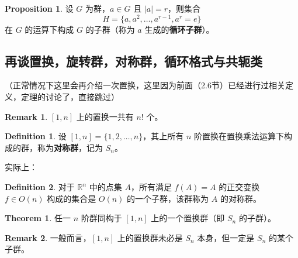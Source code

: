 \documentclass[oneside]{book}
\theoremstyle{definition}
\newtheorem{proposition}{Proposition}[section]
\newtheorem{definition}{Definition}[section]
\newtheorem{theorem}{Theorem}[section]
\newtheorem{remark}{Remark}[section]
\begin{document}
		
	\begin{proposition}
		设 \( G \) 为群，\( a \in G \) 且 \( |a| = r \)，则集合  
		\[
		H = \{ a, a^2, \dots, a^{r-1}, a^r = e \}
		\]  
		在 \( G \) 的运算下构成 \( G \) 的子群（称为 \( a \) 生成的\textbf{循环子群}）。
	\end{proposition}
	\subsection{再谈置换，旋转群，对称群，循环格式与共轭类}
	（正常情况下这里会再介绍一次置换，这里因为前面（2.6节）已经进行过相关定义，定理的讨论了，直接跳过）
	
	\begin{remark}
		\([1,n]\) 上的置换一共有 \(n!\) 个。
	\end{remark}
	
	\begin{definition}
		设 \( [1, n] = \{1, 2, \dots, n\} \)，其上所有 \( n \) 阶置换在置换乘法运算下构成的群，称为\textbf{对称群}，记为 \( S_n \)。
	\end{definition}
	实际上：
	\begin{definition}
		对于 $\mathbb{R}^n$ 中的点集 $A$，所有满足 $f(A) = A$ 的正交变换 $f \in O(n)$ 构成的集合是 $O(n)$ 的一个子群，该群称为 $A$ 的对称群。
	\end{definition}
	\begin{theorem}
		任一 \( n \) 阶群同构于 \( [1, n] \) 上的一个置换群（即 \( S_n \) 的子群）。
	\end{theorem}
	
	\begin{remark}
		一般而言，\( [1, n] \) 上的置换群未必是 \( S_n \) 本身，但一定是 \( S_n \) 的某个子群。
	\end{remark}
	
\end{document}
